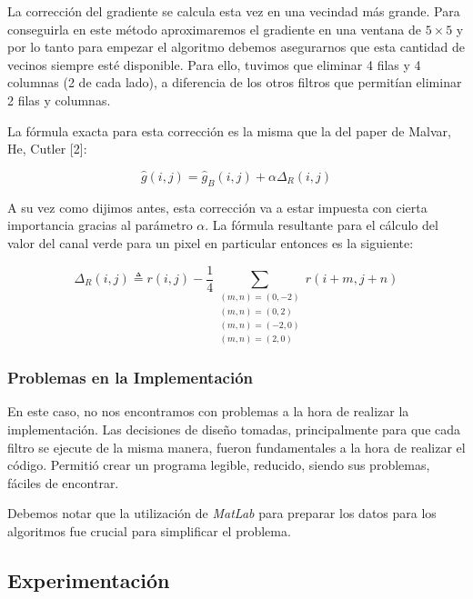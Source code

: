 La corrección del gradiente se calcula esta vez en una vecindad más grande. Para conseguirla en este método aproximaremos el gradiente en una ventana de $5 \times 5$  y por lo tanto para empezar el algoritmo debemos asegurarnos que esta cantidad de vecinos siempre esté disponible. Para ello, tuvimos que eliminar 4 filas y 4 columnas (2 de cada lado), a diferencia de los otros filtros que permitían eliminar 2 filas y columnas.

\vspace{\baselineskip}

La fórmula exacta para esta corrección es la misma que la del paper de Malvar, He, Cutler [2]: 

\[ \hat{g}(i,j) = \hat{g}_B(i,j) + \alpha\Delta_R(i,j) \]

\vspace{\baselineskip}

A su vez como dijimos antes, esta corrección va a estar impuesta con cierta importancia gracias al parámetro $\alpha$. La fórmula resultante para el cálculo del valor del canal verde para un pixel en particular entonces es la siguiente:

\[ \Delta_R(i,j) \triangleq r(i,j) - \dfrac{1}{4} \sum_{\substack{
(m,n) = (0,-2) \\
(m,n) = (0,2) \\
(m,n) = (-2,0) \\
(m,n) =  (2,0)
  }} r(i+m, j+n) \]

\newpage

\subsubsection{Problemas en la Implementación}
En este caso, no nos encontramos con problemas a la hora de realizar la implementación. Las decisiones de diseño tomadas, principalmente para que cada filtro se ejecute de la misma manera, fueron fundamentales a la hora de realizar el código. Permitió crear un programa legible, reducido, siendo sus problemas, fáciles de encontrar.

\vspace{\baselineskip}

Debemos notar que la utilización de \textit{MatLab} para preparar los datos para los algoritmos fue crucial para simplificar el problema.
	
\newpage
\subsection{Experimentación}

